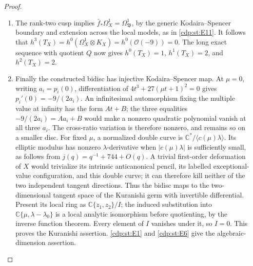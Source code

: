 \begin{proof}
\begin{enumerate}[label={$\langle1\rangle$\arabic*.},leftmargin=*]
\item The rank-two cusp implies
$\bar f_*\Omega_X^1=\Omega_{\mathfrak B}^1$, by the generic
Kodaira--Spencer boundary and extension across the local models,
as in \ref{cdp:st:E11}. It follows that
$h^3(T_X)=h^0(\Omega_X^1\otimes K_X)
=h^0(\mathcal O(-9))=0$. The long exact sequence with quotient
$Q$ now gives $h^0(T_X)=1$, $h^1(T_X)=2$, and $h^2(T_X)=2$.

\item Finally the constructed bidisc has injective Kodaira--Spencer map.
At $\mu=0$, writing $a_i=p_i(0)$, differentiation of
$4t^3+27(\mu t+1)^2=0$ gives $p_i'(0)=-9/(2a_i)$.
An infinitesimal automorphism fixing the multiple value at infinity
has the form $At+B$; the three equalities
$-9/(2a_i)=Aa_i+B$ would make a nonzero quadratic polynomial vanish
at all three $a_i$. The cross-ratio variation is therefore nonzero,
and remains so on a smaller disc. For fixed $\mu$, a normalized
double curve is $\mathbb C^*/\langle c(\mu)\lambda\rangle$.
Its elliptic modulus has nonzero $\lambda$-derivative when
$|c(\mu)\lambda|$ is sufficiently small, as follows from
$j(q)=q^{-1}+744+O(q)$. A trivial first-order deformation of $X$
would trivialize its intrinsic anticanonical pencil, its labelled
exceptional-value configuration, and this double curve; it can
therefore kill neither of the two independent tangent directions.
Thus the bidisc maps to the two-dimensional tangent space of the
Kuranishi germ with invertible differential. Present its local
ring as $\mathbb C\{z_1,z_2\}/I$; the induced substitution into
$\mathbb C\{\mu,\lambda-\lambda_0\}$ is a local analytic
isomorphism before quotienting, by the inverse function theorem.
Every element of $I$ vanishes under it, so $I=0$. This proves the
Kuranishi assertion. \ref{cdp:st:E1} and \ref{cdp:st:E6} give the algebraic-dimension assertion.

\end{enumerate}
\end{proof}
